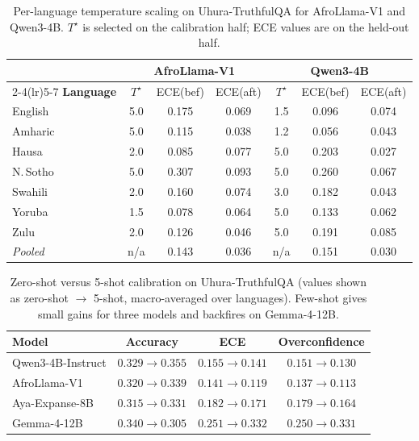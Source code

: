 \documentclass[11pt]{article}
\begin{document}
\begin{table}[h]\centering\small
\caption{Per-language temperature scaling on Uhura-TruthfulQA for AfroLlama-V1 and Qwen3-4B.
$T^\star$ is selected on the calibration half; ECE values are on the held-out half.}
\label{tab:temp_scaling}
\begin{tabular}{lcccccc}
\toprule
 & \multicolumn{3}{c}{\textbf{AfroLlama-V1}} & \multicolumn{3}{c}{\textbf{Qwen3-4B}}\\
\cmidrule(lr){2-4}\cmidrule(lr){5-7}
\textbf{Language} & $T^\star$ & ECE(bef) & ECE(aft) & $T^\star$ & ECE(bef) & ECE(aft)\\
\midrule
English   & 5.0 & 0.175 & 0.069 & 1.5 & 0.096 & 0.074\\
Amharic   & 5.0 & 0.115 & 0.038 & 1.2 & 0.056 & 0.043\\
Hausa     & 2.0 & 0.085 & 0.077 & 5.0 & 0.203 & 0.027\\
N.\,Sotho & 5.0 & 0.307 & 0.093 & 5.0 & 0.260 & 0.067\\
Swahili   & 2.0 & 0.160 & 0.074 & 3.0 & 0.182 & 0.043\\
Yoruba    & 1.5 & 0.078 & 0.064 & 5.0 & 0.133 & 0.062\\
Zulu      & 2.0 & 0.126 & 0.046 & 5.0 & 0.191 & 0.085\\
\midrule
\textit{Pooled} & n/a & 0.143 & 0.036 & n/a & 0.151 & 0.030\\
\bottomrule
\end{tabular}
\end{table}

\begin{table}[h]\centering\small
\caption{Zero-shot versus 5-shot calibration on Uhura-TruthfulQA (values shown as zero-shot
$\rightarrow$ 5-shot, macro-averaged over languages). Few-shot gives small gains for three models and
backfires on Gemma-4-12B.}
\label{tab:fewshot}
\begin{tabular}{lccc}
\toprule
\textbf{Model} & \textbf{Accuracy} & \textbf{ECE} & \textbf{Overconfidence}\\
\midrule
Qwen3-4B-Instruct & $0.329 \rightarrow 0.355$ & $0.155 \rightarrow 0.141$ & $0.151 \rightarrow 0.130$\\
AfroLlama-V1      & $0.320 \rightarrow 0.339$ & $0.141 \rightarrow 0.119$ & $0.137 \rightarrow 0.113$\\
Aya-Expanse-8B    & $0.315 \rightarrow 0.331$ & $0.182 \rightarrow 0.171$ & $0.179 \rightarrow 0.164$\\
Gemma-4-12B       & $0.340 \rightarrow 0.305$ & $0.251 \rightarrow 0.332$ & $0.250 \rightarrow 0.331$\\
\bottomrule
\end{tabular}
\end{table}
\end{document}
